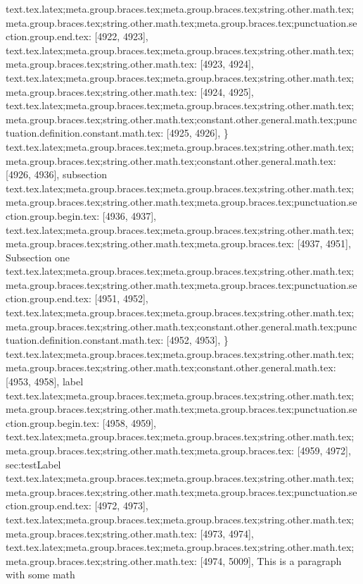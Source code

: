 {{{{{{{{{{{{{{{{{{{{{{{{{{{{{{{{{{{{{{{{{{{{{{{{{{{{{{{{{{{{{{{{{{{{{{{{{{{{{{{{{{{{{{{{{{{{{{{{{{{{{{{{{{{{{{{{{{{{{{{{{{{{{{{{{{{{{{{{{{{{{{{{{{text.tex.latex;meta.group.braces.tex;meta.group.braces.tex;string.other.math.tex;meta.group.braces.tex;string.other.math.tex;meta.group.braces.tex;punctuation.section.group.end.tex: [4922, 4923], {}}
text.tex.latex;meta.group.braces.tex;meta.group.braces.tex;string.other.math.tex;meta.group.braces.tex;string.other.math.tex: [4923, 4924], {
}
text.tex.latex;meta.group.braces.tex;meta.group.braces.tex;string.other.math.tex;meta.group.braces.tex;string.other.math.tex: [4924, 4925], {
}
text.tex.latex;meta.group.braces.tex;meta.group.braces.tex;string.other.math.tex;meta.group.braces.tex;string.other.math.tex;constant.other.general.math.tex;punctuation.definition.constant.math.tex: [4925, 4926], {\}
text.tex.latex;meta.group.braces.tex;meta.group.braces.tex;string.other.math.tex;meta.group.braces.tex;string.other.math.tex;constant.other.general.math.tex: [4926, 4936], {subsection}
text.tex.latex;meta.group.braces.tex;meta.group.braces.tex;string.other.math.tex;meta.group.braces.tex;string.other.math.tex;meta.group.braces.tex;punctuation.section.group.begin.tex: [4936, 4937], {{}
text.tex.latex;meta.group.braces.tex;meta.group.braces.tex;string.other.math.tex;meta.group.braces.tex;string.other.math.tex;meta.group.braces.tex: [4937, 4951], {Subsection one}
text.tex.latex;meta.group.braces.tex;meta.group.braces.tex;string.other.math.tex;meta.group.braces.tex;string.other.math.tex;meta.group.braces.tex;punctuation.section.group.end.tex: [4951, 4952], {}}
text.tex.latex;meta.group.braces.tex;meta.group.braces.tex;string.other.math.tex;meta.group.braces.tex;string.other.math.tex;constant.other.general.math.tex;punctuation.definition.constant.math.tex: [4952, 4953], {\}
text.tex.latex;meta.group.braces.tex;meta.group.braces.tex;string.other.math.tex;meta.group.braces.tex;string.other.math.tex;constant.other.general.math.tex: [4953, 4958], {label}
text.tex.latex;meta.group.braces.tex;meta.group.braces.tex;string.other.math.tex;meta.group.braces.tex;string.other.math.tex;meta.group.braces.tex;punctuation.section.group.begin.tex: [4958, 4959], {{}
text.tex.latex;meta.group.braces.tex;meta.group.braces.tex;string.other.math.tex;meta.group.braces.tex;string.other.math.tex;meta.group.braces.tex: [4959, 4972], {sec:testLabel}
text.tex.latex;meta.group.braces.tex;meta.group.braces.tex;string.other.math.tex;meta.group.braces.tex;string.other.math.tex;meta.group.braces.tex;punctuation.section.group.end.tex: [4972, 4973], {}}
text.tex.latex;meta.group.braces.tex;meta.group.braces.tex;string.other.math.tex;meta.group.braces.tex;string.other.math.tex: [4973, 4974], {
}
text.tex.latex;meta.group.braces.tex;meta.group.braces.tex;string.other.math.tex;meta.group.braces.tex;string.other.math.tex: [4974, 5009], {This is a paragraph with some math }
}}}}}}}}}}}}}}}}}}}}}}}}}}}}}}}}}}}}}}}}}}}}}}}}}}}}}}}}}}}}}}}}}}}}}}}}}}}}}}}}}}}}}}}}}}}}}}}}}}}}}}}}}}}}}}}}}}}}}}}}}}}}}}}}}}}}}}}}}}}}}}}}}}}
